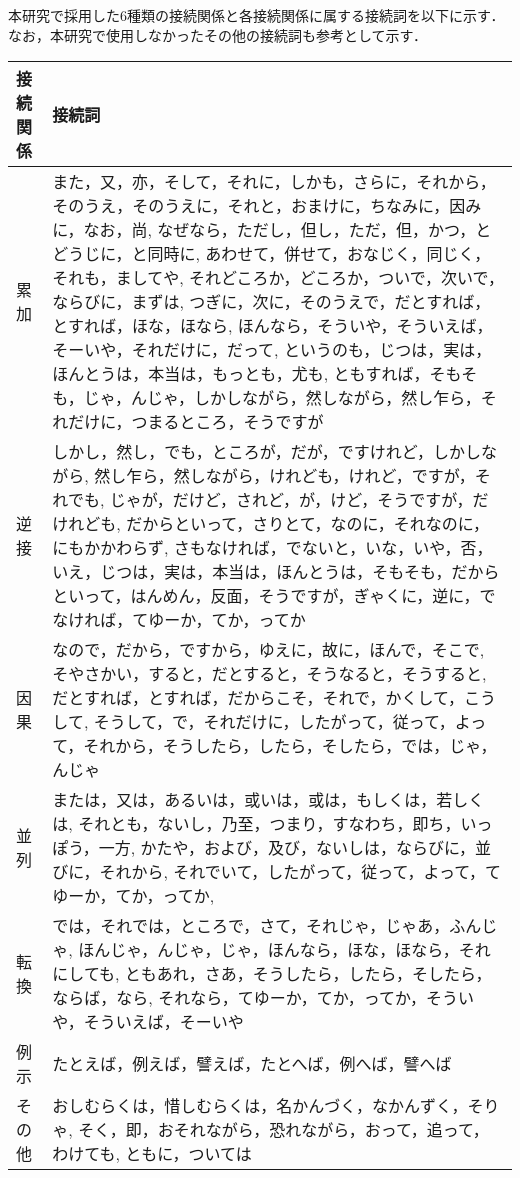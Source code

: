\documentclass[japanese]{jnlp_1.4}
\begin{document}
\appendix

本研究で採用した6種類の接続関係と各接続関係に属する接続詞を以下に示す．なお，本研究で使用しなかったその他の接続詞も参考として示す．

\vspace{\baselineskip}
\begin{center}
\small
\begin{tabular}{lp{}}
\hline
接続関係& 
接続詞 \\
\hline
累加& 
また，又，亦，そして，それに，しかも，さらに，それから，そのうえ，そのうえに，それと，おまけに，ちなみに，因みに，なお，尚, なぜなら，ただし，但し，ただ，但，かつ，とどうじに，と同時に, あわせて，併せて，おなじく，同じく，それも，ましてや, それどころか，どころか，ついで，次いで，ならびに，まずは, つぎに，次に，そのうえで，だとすれば，とすれば，ほな，ほなら, ほんなら，そういや，そういえば，そーいや，それだけに，だって, というのも，じつは，実は，ほんとうは，本当は，もっとも，尤も, ともすれば，そもそも，じゃ，んじゃ，しかしながら，然しながら，然し乍ら，それだけに，つまるところ，そうですが \\
\hline
逆接& 
しかし，然し，でも，ところが，だが，ですけれど，しかしながら, 然し乍ら，然しながら，けれども，けれど，ですが，それでも, じゃが，だけど，されど，が，けど，そうですが，だけれども, だからといって，さりとて，なのに，それなのに，にもかかわらず, さもなければ，でないと，いな，いや，否，いえ，じつは，実は，本当は，ほんとうは，そもそも，だからといって，はんめん，反面，そうですが，ぎゃくに，逆に，でなければ，てゆーか，てか，ってか \\
\hline
因果& 
なので，だから，ですから，ゆえに，故に，ほんで，そこで, そやさかい，すると，だとすると，そうなると，そうすると, だとすれば，とすれば，だからこそ，それで，かくして，こうして, そうして，で，それだけに，したがって，従って，よって，それから，そうしたら，したら，そしたら，では，じゃ，んじゃ \\
\hline
並列& 
または，又は，あるいは，或いは，或は，もしくは，若しくは, それとも，ないし，乃至，つまり，すなわち，即ち，いっぽう，一方, かたや，および，及び，ないしは，ならびに，並びに，それから, それでいて，したがって，従って，よって，てゆーか，てか，ってか, \\
\hline
転換& 
では，それでは，ところで，さて，それじゃ，じゃあ，ふんじゃ, ほんじゃ，んじゃ，じゃ，ほんなら，ほな，ほなら，それにしても, ともあれ，さあ，そうしたら，したら，そしたら，ならば，なら, それなら，てゆーか，てか，ってか，そういや，そういえば，そーいや \\
\hline
例示& 
たとえば，例えば，譬えば，たとへば，例へば，譬へば \\
\hline
その他& 
おしむらくは，惜しむらくは，名かんづく，なかんずく，そりゃ, そく，即，おそれながら，恐れながら，おって，追って，わけても, ともに，ついては \\
\hline
\end{tabular}
\end{center}
\end{document}
